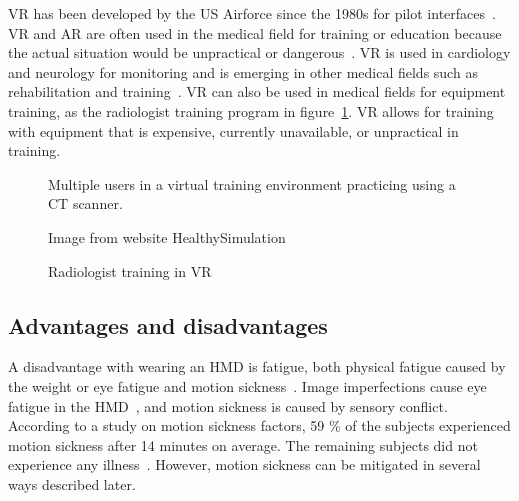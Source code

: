 \documentclass[a4paper]{report}
\begin{document}
VR has been developed by the US Airforce since the 1980s for pilot interfaces~\cite{mertz_virtual_2019}. VR and AR are often used in the medical field for training or education because the actual situation would be unpractical or dangerous~\cite{freina_immersive_2015}.
VR is used in cardiology and neurology for monitoring and is emerging in other medical fields such as rehabilitation and training~\cite{javaid_virtual_2020}.
VR can also be used in medical fields for equipment training, as the radiologist training program in figure~\ref{training}. VR allows for training with equipment that is expensive, currently unavailable, or unpractical in training.

\begin{figure}[h!]
    \centering
	\hfill
  \caption{Radiologist training in VR}
  \label{training}
  \small
Multiple users in a virtual training environment practicing using a CT scanner.

Image from website HealthySimulation~\cite{noauthor_how_2020}
\end{figure}

\subsection{Advantages and disadvantages}
A disadvantage with wearing an HMD is fatigue, both physical fatigue caused by the weight or eye fatigue and motion sickness~\cite{merhi_motion_2007}.
Image imperfections cause eye fatigue in the HMD~\cite{kooi_visual_2004}, and motion sickness is caused by sensory conflict.
According to a study on motion sickness factors, 59 \% of the subjects experienced motion sickness after 14 minutes on average. The remaining subjects did not experience any illness~\cite{kooi_visual_2004}. However, motion sickness can be mitigated in several ways described later.
\end{document}
